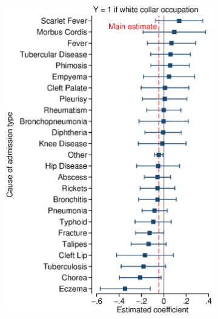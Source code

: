 \documentclass[12pt,english]{article}
\begin{document}
\begin{figure}[!ht]
\begin{subfigure}{0.325\textwidth}
	\includegraphics[width=1.00\linewidth]{../output/02_appendix/figure_a09_panel_3.eps}
\end{subfigure}
\begin{subfigure}{0.325\textwidth}
	\centering

\end{subfigure}
\end{figure}
\end{document}
